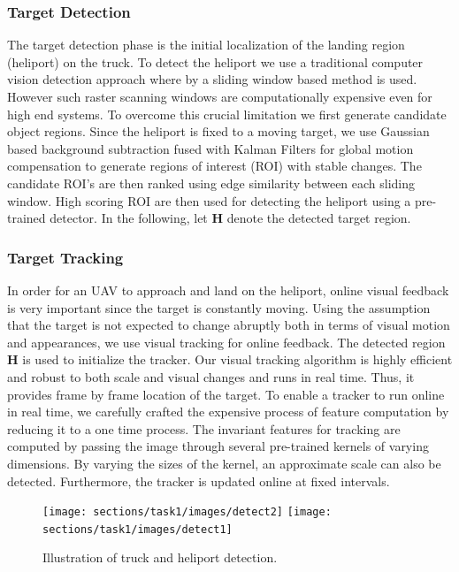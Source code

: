 \documentclass{standalone}
\begin{document}
\subsubsection{Target Detection}
The target detection phase is the initial localization of the landing
region (heliport) on the truck. To detect the heliport we use a
traditional computer vision detection approach where by a sliding
window based method is used. However such raster scanning windows are
computationally expensive even for high end systems. To overcome this
crucial limitation we first generate candidate object
regions. Since the heliport is fixed to a moving target, we use
Gaussian based background subtraction fused with Kalman Filters for 
global motion compensation to generate regions of interest
(ROI)  with stable changes. The candidate ROI's are then ranked using
edge similarity between each sliding window. High scoring ROI are then
used for detecting the heliport using a pre-trained detector. 
In the following, let $\mathbf{H}$ denote the detected target region.

\subsubsection{Target Tracking}

In order for an UAV to approach and land on the heliport, online visual
feedback is very important since the target is constantly moving.
Using the assumption that the target is not
expected to change abruptly both in terms of visual motion and
appearances, we use visual tracking for online feedback.
The detected region $\mathbf{H}$ is used to initialize the
tracker. Our visual tracking algorithm is highly efficient and robust
to both scale and visual changes and runs in real time. Thus, it provides frame by frame location of the target. To enable a tracker
to run online in real time, we carefully crafted the expensive process
of feature computation by reducing it to a one time process. 
The invariant features for tracking are computed by passing the image
through several pre-trained kernels of varying dimensions. By varying
the sizes of the kernel, an approximate scale can also be detected.
Furthermore, the tracker is updated online at fixed intervals.

\begin{figure}[t!]
  \centering
  \texttt{[image: sections/task1/images/detect2]}
  \texttt{[image: sections/task1/images/detect1]}
  \caption{Illustration of truck and heliport detection.}
\end{figure}
\end{document}
